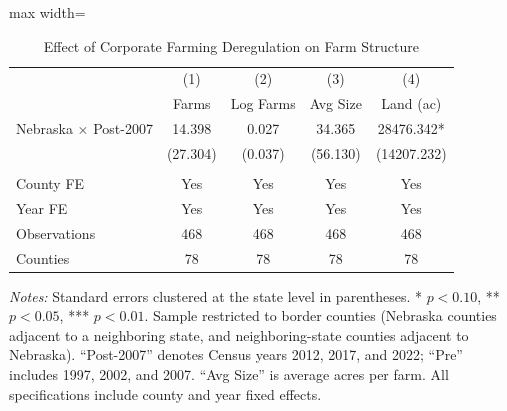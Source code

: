 \begin{table}[H]
\centering
\caption{Effect of Corporate Farming Deregulation on Farm Structure}
\label{tab:main}
\begin{threeparttable}
\begin{adjustbox}{max width=\textwidth}
\begin{tabular}{lcccc}
\toprule
 & (1) & (2) & (3) & (4) \\
 & Farms & Log Farms & Avg Size & Land (ac) \\
\midrule
Nebraska $\times$ Post-2007 & 14.398 & 0.027 & 34.365 & 28476.342* \\
 & (27.304) & (0.037) & (56.130) & (14207.232) \\
\\
County FE & Yes & Yes & Yes & Yes \\
Year FE & Yes & Yes & Yes & Yes \\
Observations & 468 & 468 & 468 & 468 \\
Counties & 78 & 78 & 78 & 78 \\
\bottomrule
\end{tabular}
\end{adjustbox}
\begin{tablenotes}[flushleft]
\small
\item \textit{Notes:} Standard errors clustered at the state level in parentheses. * $p<0.10$, ** $p<0.05$, *** $p<0.01$. Sample restricted to border counties (Nebraska counties adjacent to a neighboring state, and neighboring-state counties adjacent to Nebraska). ``Post-2007'' denotes Census years 2012, 2017, and 2022; ``Pre'' includes 1997, 2002, and 2007. ``Avg Size'' is average acres per farm. All specifications include county and year fixed effects.
\end{tablenotes}
\end{threeparttable}
\end{table}
